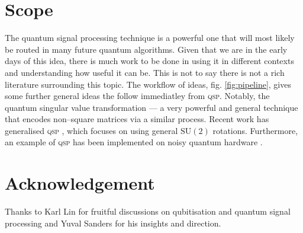\documentclass{article}
\begin{document}
\section{Scope}
The quantum signal processing technique is a powerful one that will most likely be routed in many future quantum algorithms. Given that we are in the early days of this idea, there is much work to be done in using it in different contexts and understanding how useful it can be. This is not to say there is not a rich literature surrounding this topic. The workflow of ideas, fig. \ref{fig:pipeline}, gives some further general ideas the follow immediatley from \textsc{qsp}. Notably, the quantum singular value transformation \cite{GSLW19} --- a very powerful and general technique that encodes non--square matrices via a similar process. Recent work has generalised \textsc{qsp} \cite{MW23}, which focuses on using general $\text{SU}(2)$ rotations. Furthermore, an example of \textsc{qsp} has been implemented on noisy quantum hardware \cite{KKCLB23}. 

\section*{Acknowledgement}\label{sec:ack}
Thanks to Karl Lin for fruitful discussions on qubitisation and quantum signal processing and Yuval Sanders for his insights and direction.

\newpage


\end{document}
